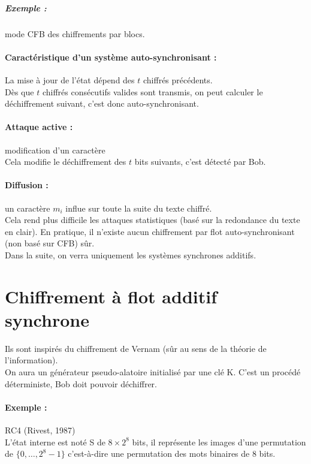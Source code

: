 \documentclass[12pt,a4paper]{report}
\begin{document}
\subparagraph{Exemple :} mode CFB des chiffrements par blocs.
\begin{center}
  \scalebox{0.5}{}	
\end{center}
\paragraph{Caractéristique d'un système auto-synchronisant :\\}
La mise à jour de l'état dépend des $t$ chiffrés précédents.\\
Dès que $t$ chiffrés consécutifs valides sont transmis, on peut calculer le déchiffrement suivant, c'est donc auto-synchronisant.
\paragraph{Attaque active :} modification d'un caractère \\
Cela modifie le déchiffrement des $t$ bits suivants, c'est détecté par Bob.
\paragraph{Diffusion :} un caractère $m_i$ influe sur toute la suite du texte chiffré.\\
Cela rend plus difficile les attaques statistiques (basé sur la redondance du texte en clair). En pratique, il n'existe aucun chiffrement par flot auto-synchronisant (non basé sur CFB) sûr.\\


Dans la suite, on verra uniquement les systèmes synchrones additifs.

\section{Chiffrement à flot additif synchrone}
\begin{figure}[h]
	\centering
  \scalebox{0.7}{}	
\end{figure}

Ils sont inspirés du chiffrement de Vernam (sûr au sens de la théorie de l'information).\\
On aura un générateur pseudo-alatoire initialisé par une clé K. C'est un procédé déterministe, Bob doit pouvoir déchiffrer.
\paragraph{Exemple :} RC4 (Rivest, 1987)\\
L'état interne est noté S de $8\times 2^8$ bits, il représente les images d'une permutation de $\{0,\ldots,2^8-1\}$ c'est-à-dire une permutation des mots binaires de 8 bits.
\end{document}
